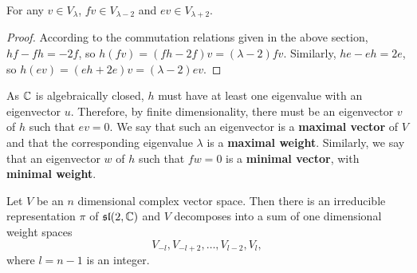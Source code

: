 \documentclass[a4paper]{article}
\begin{document}
\begin{prop}
    For any $v \in V_\lambda$, ${f} v \in V_{\lambda - 2}$ and ${e} v \in V_{\lambda + 2}$.
\end{prop}

\begin{proof}
    According to the commutation relations given in the above section, ${h}{f} - {f}{h} = -2{f}$, so ${h}({f}v) = ({f}{h} - 2{f}) v = (\lambda - 2){f}v$. Similarly, ${h}{e} - {e}{h} = 2{e}$, so ${h}({e}v) = ({e}{h} + 2{e}) v = (\lambda - 2){e}v$.
\end{proof}

As $\mathbb{C}$ is algebraically closed, ${h}$ must have at least one eigenvalue with an eigenvector $u$. Therefore, by finite dimensionality, there must be an eigenvector $v$ of ${h}$ such that ${e} v = 0$. We say that such an eigenvector is a \textbf{maximal vector} of $V$ and that the corresponding eigenvalue $\lambda$ is a \textbf{maximal weight}. Similarly, we say that an eigenvector $w$ of ${h}$ such that ${f} w = 0$ is a \textbf{minimal vector}, with \textbf{minimal weight}.

\begin{thm}
    Let $V$ be an $n$ dimensional complex vector space. Then there is an irreducible representation $\pi$ of $\mathfrak{sl}(2, \mathbb{C})$ and $V$ decomposes into a sum of one dimensional weight spaces 
    $$V_{-l}, V_{-l + 2}, \hdots, V_{l -2}, V_{l},$$
    where $l = n - 1$ is an integer.
\end{thm}
\end{document}
